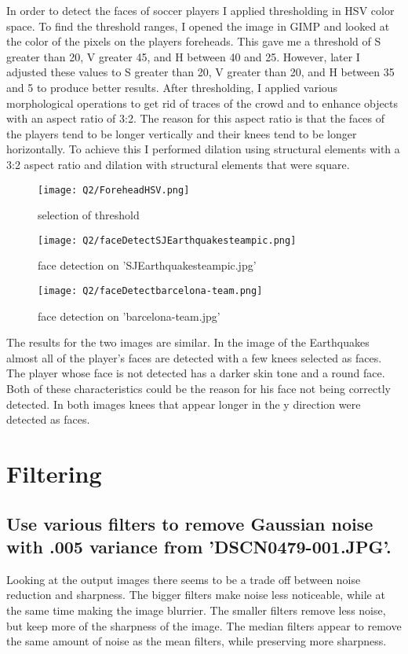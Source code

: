 \documentclass{article}
\begin{document}
	
	In order to detect the faces of soccer players I applied thresholding in HSV color space. To find the threshold ranges, I opened the image in GIMP and looked at the color of the pixels on the players foreheads. This gave me a threshold of S greater than 20, V greater 45, and H between 40 and 25. However, later I adjusted these values to S greater than 20, V greater than 20, and H between 35 and 5 to produce better results. After thresholding, I applied various morphological operations to get rid of traces of the crowd and to enhance objects with an aspect ratio of 3:2. The reason for this aspect ratio is that the faces of the players tend to be longer vertically and their knees tend to be longer horizontally. To achieve this I performed dilation using structural elements with a 3:2 aspect ratio and dilation with structural elements that were square.
	
	
	\begin{figure}[H]
		\texttt{[image: Q2/ForeheadHSV.png]}
		\caption{selection of threshold}
	\end{figure}
	\begin{figure}[H]
		\texttt{[image: Q2/faceDetectSJEarthquakesteampic.png]}
		\caption{face detection on 'SJEarthquakesteampic.jpg'}
	\end{figure}
	\begin{figure}[H]
		\texttt{[image: Q2/faceDetectbarcelona-team.png]}
		\caption{face detection on 'barcelona-team.jpg'}
	\end{figure}
	
	
	The results for the two images are similar. In the image of the Earthquakes almost all of the player's faces are detected with a few knees selected as faces. The player whose face is not detected has a darker skin tone and a round face. Both of these characteristics could be the reason for his face not being correctly detected. In both images knees that appear longer in the y direction were detected as faces.
	
	\newpage
	\section{Filtering}
	\subsection{Use various filters to remove Gaussian noise with .005 variance from 'DSCN0479-001.JPG'.}
		
	
	Looking at the output images there seems to be a trade off between noise reduction and sharpness. The bigger filters make noise less noticeable, while at the same time making the image blurrier. The smaller filters remove less noise, but keep more of the sharpness of the image. The median filters appear to remove the same amount of noise as the mean filters, while preserving more sharpness.
		
\end{document}
